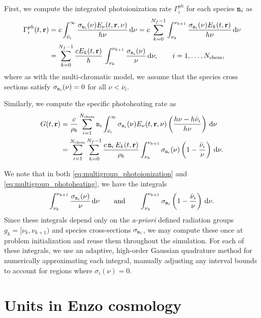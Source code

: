 \documentclass[10pt]{article}
\renewcommand{\(}{\left(}
\renewcommand{\)}{\right)}
\newcommand{\rvec}{{\bf r}}
\newcommand{\rhob}{\rho_b}
\newcommand{\Enu}{E_{\nu}}
\newcommand{\mn}{{\tt n}}
\begin{document}
First, we compute the integrated photoionization rate $\Gamma_i^{ph}$
for each species $\mn_i$ as 
\begin{align}
\label{eq:multigroup_photoionization}
   \Gamma_i^{ph}(t,\rvec)  &= 
   c \int_{\bar{\nu}_i}^{\infty} \frac{\sigma_{\mn_i}(\nu)\Enu(t,\rvec,\nu)}{h\nu}\,\mathrm d\nu =  
   c \sum_{k=0}^{N_f-1} \int_{\nu_k}^{\nu_{k+1}} \frac{\sigma_{\mn_i}(\nu) E_k(t,\rvec)}{h\nu}\,\mathrm d\nu \\
\notag
   &= \sum_{k=0}^{N_f-1} \frac{c E_k(t,\rvec)}{h}\,
   \int_{\nu_k}^{\nu_{k+1}} \frac{\sigma_{\mn_i}(\nu)}{\nu}\,\mathrm
   d\nu, \qquad i=1,\ldots,N_\text{chem},
\end{align}
where as with the multi-chromatic model, we assume that the species
cross sections satisfy $\sigma_{\mn_i}(\nu) = 0$ for all $\nu <
\bar{\nu}_i$.

Similarly, we compute the specific photoheating rate as 
\begin{align}
\notag
   G(t,\rvec) &= 
   \frac{c}{\rhob} \sum_{i=1}^{N_\text{chem}} \mn_i
     \int_{\bar{\nu}_i}^{\infty} \sigma_{\mn_i}(\nu) \Enu(t,\rvec,\nu)
     \left(\frac{h\nu - h\bar{\nu}_i}{h\nu}\right)\,\mathrm d\nu \\
\label{eq:multigroup_photoheating}
     &= 
   \sum_{i=1}^{N_\text{chem}} \sum_{k=0}^{N_f-1} \frac{c\,\mn_i\, E_k(t,\rvec)}{\rhob} 
     \int_{\nu_k}^{\nu_{k+1}} \sigma_{\mn_i}(\nu) 
     \left(1 - \frac{\bar{\nu}_i}{\nu}\right)\,\mathrm d\nu.
\end{align}

We note that in both \eqref{eq:multigroup_photoionization} and
\eqref{eq:multigroup_photoheating}, we have the integrals 
\begin{align}
  \label{eq:integrals} 
    \int_{\nu_k}^{\nu_{k+1}} \frac{\sigma_{\mn_i}(\nu)}{\nu}\,\mathrm d\nu
    \qquad\text{and}\qquad
    \int_{\nu_k}^{\nu_{k+1}} \sigma_{\mn_i} \left(1 - \frac{\bar{\nu}_i}{\nu}\right)\,\mathrm d\nu.
\end{align}
Since these integrals depend only on the {\em a-priori} defined
radiation groups $g_k=[\nu_k,\nu_{k+1})$ and species cross-sections
$\sigma_{\mn_i}$, we may compute these once at problem initialization
and reuse them throughout the simulation.  For each of these
integrals, we use an adaptive, high-order Gaussian quadrature
method for numerically approximating each integral, manually adjusting
any interval bounds to account for regions where $\sigma_i(\nu)=0$.




\section{Units in Enzo cosmology}
\label{sec:units}
\end{document}
